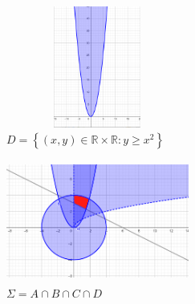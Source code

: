 \begin{figure}[h]
	\centering
	\includegraphics[width=6cm,height=4cm]{MengeD.png}
	\caption{$D = \left\{ \left(x,y \right) \in \mathbb{R} \times \mathbb{R}: y \ge x^2 \right\}$}
	\label{fig:Menge D}
\end{figure}

\begin{figure}[h]
	\centering
	\includegraphics[width=6cm,height=4cm]{MengeE.png}
	\caption{$\Sigma = A \cap B \cap C \cap D$}
	\label{fig:Menge D}
\end{figure}
\clearpage